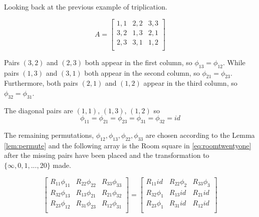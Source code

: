 \begin{example}
Looking back at the previous example of triplication.

\begin{equation}
 A = \begin{bmatrix}
  1,1 & 2,2 & 3,3 \\
  3,2 & 1,3 & 2,1 \\
  2,3 & 3,1 & 1,2 \\
 \end{bmatrix}
\end{equation}

Pairs $(3, 2)$ and $(2, 3)$ both appear in the first column, so $\phi _{13} = \phi _{12}$.
While pairs $(1, 3)$ and $(3, 1)$ both appear in the second column, so $\phi _{21} = \phi _{23}$.
Furthermore, both pairs $(2, 1)$ and $(1, 2)$ appear in the third column, so $\phi _{32} = \phi _{31}$.

The diagonal pairs are $(1, 1)$, $(1, 3)$, $(1, 2)$ so
\begin{equation*}
  \phi _{11} = \phi _{21} = \phi _{23} = \phi _{31} = \phi _{32} = id
\end{equation*}

The remaining permutations, $\phi _{12}, \phi _{13}, \phi _{22}, \phi _{33}$ are chosen according to the Lemma \ref{lem:permute} and the following array is the Room square in \ref{eq:roomtwentyone} after the missing pairs have been placed and the transformation to $\{\infty, 0, 1, ..., 20\}$ made.

\begin{equation*}
  \begin{bmatrix}
   R_{11}\phi_{11} & R_{22}\phi_{22} & R_{33}\phi_{33} \\
   R_{32}\phi_{13} & R_{13}\phi_{21} & R_{21}\phi_{32} \\
   R_{23}\phi_{12} & R_{31}\phi_{23} & R_{12}\phi_{31} \\
  \end{bmatrix}
  =
  \begin{bmatrix}
      R_{11}id    & R_{22}\phi_{2} & R_{33}\phi_{3} \\
   R_{32}\phi_{1} &   R_{13}id     &    R_{21}id    \\
   R_{23}\phi_{1} &   R_{31}id     &    R_{12}id    \\
  \end{bmatrix}
\end{equation*}

\end{example}

